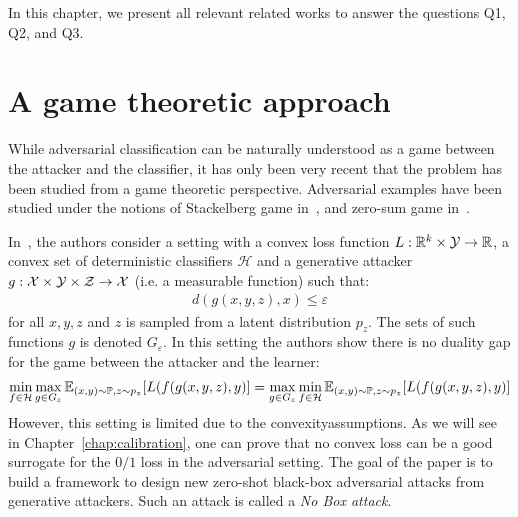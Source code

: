 In this chapter, we present all relevant related works to answer the questions Q1, Q2, and Q3. 

\section{A game theoretic approach }

While adversarial classification can be naturally understood as a game between the attacker and the classifier, it has only been very recent that the problem has been studied from a game theoretic perspective. Adversarial examples have been studied under  the notions of Stackelberg game in~\cite{10.1145/2020408.2020495}, and  zero-sum game in~\cite{7533509,DBLP:journals/corr/abs-1906-02816,bose2021adversarial}.


In~\citep{bose2021adversarial}, the authors consider a setting with a convex loss function $L:\mathbb{R}^k\times\mathcal{Y} \to\mathbb{R}$, a convex set of deterministic classifiers $\mathcal{H}$ and a generative attacker $g:\mathcal{X}\times\mathcal{Y}\times\mathcal{Z}\to\mathcal{X}$ (i.e. a measurable function) such that:
\begin{align*}
   d(g(x,y,z),x)\leq\varepsilon 
\end{align*}
for all $x,y,z$ and $z$ is sampled from a latent distribution $p_z$. The sets of such functions $g$ is denoted $G_\varepsilon$. In this setting the authors show there is no duality gap for the game between the attacker and the learner:
\begin{align*}
    \min_{f\in\mathcal{H}}\max_{g\in G_\varepsilon}\mathbb{E}_{(x,y)\sim\PP,z\sim p_z}\left[L\left(f(g(x,y,z),y\right)\right] =   \max_{g\in G_\varepsilon}  \min_{f\in\mathcal{H}}\mathbb{E}_{(x,y)\sim\PP,z\sim p_z}\left[L\left(f(g(x,y,z),y\right)\right]
\end{align*} 
 However, this setting is limited due to the convexityassumptions. As we will see in Chapter~\ref{chap:calibration}, one can prove that no convex loss can be a good surrogate for the $0/1$ loss in the adversarial setting. The goal of the paper is to build a framework to design new zero-shot black-box adversarial attacks from generative attackers. Such an attack is called a \emph{No Box attack}.

